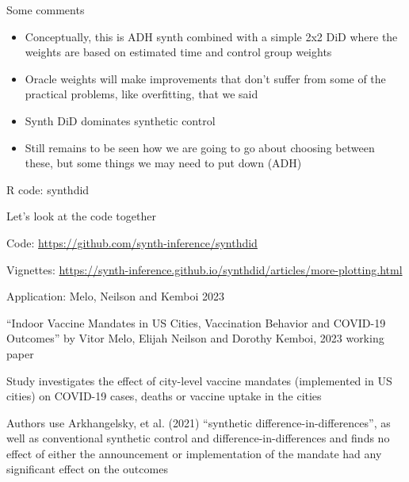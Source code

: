 \documentclass{beamer}
\begin{document}
\begin{frame}{Some comments}

\begin{itemize}
\item Conceptually, this is ADH synth combined with a simple 2x2 DiD where the weights are based on estimated time and control group weights
\item Oracle weights will make improvements that don't suffer from some of the practical problems, like overfitting, that we said
\item Synth DiD dominates synthetic control
\item Still remains to be seen how we are going to go about choosing between these, but some things we may need to put down (ADH)
\end{itemize}

\end{frame}

\begin{frame}{R code: synthdid}

Let's look at the code together

\bigskip

Code: \url{https://github.com/synth-inference/synthdid} 

\bigskip

Vignettes: \url{https://synth-inference.github.io/synthdid/articles/more-plotting.html}

\end{frame}

\begin{frame}{Application: Melo, Neilson and Kemboi 2023}


``Indoor Vaccine Mandates in US Cities, Vaccination Behavior and COVID-19 Outcomes'' by Vitor Melo, Elijah Neilson and Dorothy Kemboi, 2023 working paper

\bigskip

Study investigates the effect of city-level vaccine mandates (implemented in US cities) on COVID-19 cases, deaths or vaccine uptake in the cities

\bigskip

Authors use Arkhangelsky, et al. (2021) ``synthetic difference-in-differences'', as well as conventional synthetic control and difference-in-differences and finds no effect of either the announcement or implementation of the mandate had any significant effect on the outcomes

\end{frame}
\end{document}
